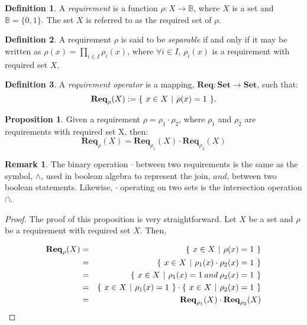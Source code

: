 \documentclass{article}
\theoremstyle{definition}
\newtheorem{definition}{Definition}[section]
\newtheorem{proposition}{Proposition}[section]
\newtheorem*{remark}{Remark}
\theoremstyle{remark}
\newcommand{\reqfunc}[2]{#1:#2\rightarrow\mathbb{B}}
\newcommand{\reqop}[2]{\mathbf{Req}_{#1}(#2)}
\newcommand{\setbuild}[3]
{
	\{\hspace{0.05in} 
	#1 \in #2 \hspace{0.05in} 
	| \hspace{0.05in}#3\hspace{0.05in}
	\}	
}
\begin{document}
		\begin{definition}
			A \emph{requirement} is a function $\reqfunc{\rho}{X}$, where $X$ is a set and $\mathbb{B} = \{0,1\}$. The set $X$ is referred to as the required set of $\rho$.
		\end{definition}
		
		\begin{definition}
			A requirement $\rho$ is said to be \emph{separable} if and only if it may be written as $\rho(x) = \prod_{i \in I}{\rho_{i}(x)}$, where $\forall i \in I$, $\rho_{i}(x)$ is a requirement with required set $X$.
		\end{definition}
		
		\begin{definition}
			A \emph{requirement operator} is a mapping, $\mathbf{Req}: \mathbf{Set} \rightarrow \mathbf{Set}$, such that: \[\reqop{\rho}{X} := \setbuild{x}	{X}{\rho(x) = 1}.\]
		\end{definition}
		
		\begin{proposition}
			Given a requirement $\rho = \rho_{1}\cdot\rho_{2}$, where $\rho_{1}$ and $\rho_{2}$ are requirements with required set X, then: 
			\[
			\reqop{\rho}{X}\stackrel{~}{=}\reqop{\rho_{1}}{X}\cdot\reqop{\rho_{2}}{X}
			\]
		\end{proposition}
		
		\begin{remark}
			The binary operation $\cdot$ between two requirements is the same as the symbol, $\wedge$, used in boolean
            algebra to represent the join, $and$, between two boolean statements. Likewise, $\cdot$ operating on two sets
            is the intersection operation $\cap$.
		\end{remark}
		
		\begin{proof}
			The proof of this proposition is very straightforward. Let $X$ be a set and $\rho$ be a requirement with
            required set $X$. Then,
			
			\begin{eqnarray}
			\reqop{\rho}{X} & = & \setbuild{x}{X}{\rho(x) = 1}\\ 
			& = & \setbuild{x}{X}{\rho_{1}(x)\cdot\rho_{2}(x) = 1}\\ 
			& = & \setbuild{x}{X}{\rho_{1}(x) = 1 \mathbin{and} \rho_{2}(x) = 1}\\ 
			& = & \setbuild{x}{X}{\rho_{1}(x) = 1}\cdot\setbuild{x}{X}{\rho_{2}(x) = 1}\\
			& = & \reqop{\rho_{1}}{X}\cdot\reqop{\rho_{2}}{X}
			\end{eqnarray}
		\end{proof}
	
\end{document}
